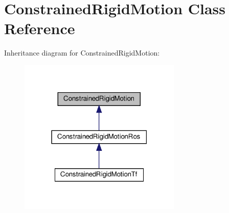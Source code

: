 \hypertarget{classConstrainedRigidMotion}{}\section{Constrained\+Rigid\+Motion Class Reference}
\label{classConstrainedRigidMotion}


Inheritance diagram for Constrained\+Rigid\+Motion\+:\nopagebreak
\begin{figure}[H]
\begin{center}
\leavevmode
\includegraphics[width=219pt]{db/d32/classConstrainedRigidMotion__inherit__graph}
\end{center}
\end{figure}
